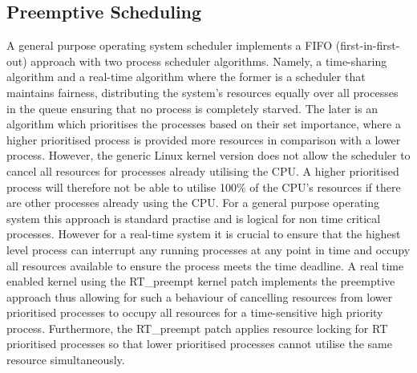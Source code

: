 \subsection{Preemptive Scheduling}
A general purpose operating system scheduler implements a FIFO (first-in-first-out) approach with two process scheduler algorithms. Namely, a time-sharing algorithm and a real-time algorithm where the former is a scheduler that maintains fairness, distributing the system's resources equally over all processes in the queue ensuring that no process is completely starved. The later is an algorithm which prioritises the processes based on their set importance, where a higher prioritised process is provided more resources in comparison with a lower process. However, the generic Linux kernel version does not allow the scheduler to cancel all resources for processes already utilising the CPU. A higher prioritised process will therefore not be able to utilise 100\% of the CPU's resources if there are other processes already using the CPU. For a general purpose operating system this approach is standard practise and is logical for non time critical processes. However for a real-time system it is crucial to ensure that the highest level process can interrupt any running processes at any point in time and occupy all resources available to ensure the process meets the time deadline. A real time enabled kernel using the RT\_preempt kernel patch implements the preemptive approach thus allowing for such a behaviour of cancelling resources from lower prioritised processes to occupy all resources for a time-sensitive high priority process. Furthermore, the RT\_preempt patch applies resource locking for RT prioritised processes so that lower prioritised processes cannot utilise the same resource simultaneously.


